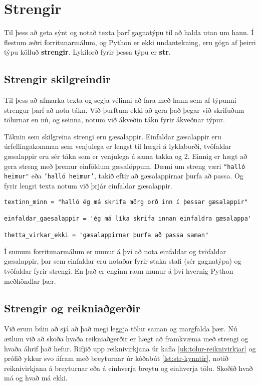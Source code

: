 

\chapter{Strengir}\label{k:strengir}
Til þess að geta sýnt og notað texta þarf gagnatýpu til að halda utan um hann.
Í flestum æðri forritunarmálum, og Python er ekki undantekning, eru gögn af þeirri týpu kölluð \textbf{strengir}.
Lykilorð fyrir þessa týpu er \textbf{str}.

\section{Strengir skilgreindir}
Til þess að afmarka texta og segja vélinni að fara með hann sem af týpunni strengur þarf að nota tákn.
Við þurftum ekki að gera það þegar við skrifuðum tölurnar en nú, og seinna, notum við ákveðin tákn fyrir ákveðnar týpur.

Táknin sem skilgreina strengi eru gæsalappir.
Einfaldar gæsalappir eru úrfellingakomman sem venjulega er lengst til hægri á lyklaborði, tvöfaldar gæsalappir eru sér tákn sem er venjulega á sama takka og 2.
Einnig er hægt að gera streng með þremur einföldum gæsalöppum.
Dæmi um streng væri \texttt{"halló heimur"} eða \texttt{'halló heimur'}, takið eftir að gæsalappirnar þurfa að passa.
Og fyrir lengri texta notum við þrjár einfaldar gæsalappir.

\begin{lstlisting}[caption=Strengir skilgreindir, label=lst:str-kynntir]
textinn_minn = "halló ég má skrifa mörg orð inn í þessar gæsalappir"

einfaldar_gaesalappir = 'ég má líka skrifa innan einfaldra gæsalappa'

thetta_virkar_ekki = 'gæsalappirnar þurfa að passa saman" 
\end{lstlisting}

Í sumum forritunarmálum er munur á því að nota einfaldar og tvöfaldar gæsalappir, þar sem einfaldar eru notaðar fyrir staka stafi (sér gagnatýpa) og tvöfaldar fyrir strengi.
En það er enginn raun munur á því hvernig Python meðhöndlar þær.

\section{Strengir og reikniaðgerðir}
Við erum búin að sjá að það megi leggja tölur saman og margfalda þær.
Nú ætlum við að skoða hvaða reikniaðgerðir er hægt að framkvæma með strengi og hvaða áhrif það hefur.
Rifjið upp reiknivirkjana úr kafla \ref{uk:tolur-reiknivirkjar} og prófið ykkur svo áfram með breyturnar úr kóðabút \ref{lst:str-kynntir}, notið reiknivirkjana á breyturnar eða á einhverja breytu og einhverja tölu.
Skoðið hvað má og hvað má ekki.

